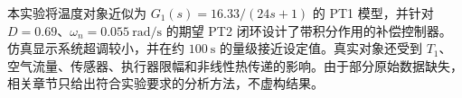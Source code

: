 本实验将温度对象近似为 $G_1(s) = 16.33/(24s + 1)$ 的 PT1 模型，并针对 $D = 0.69$、$\omega_n = \SI{0.055}{\radian\per\second}$ 的期望 PT2 闭环设计了带积分作用的补偿控制器。仿真显示系统超调较小，并在约 $\SI{100}{\second}$ 的量级接近设定值。真实对象还受到 $T_1$、空气流量、传感器、执行器限幅和非线性热传递的影响。由于部分原始数据缺失，相关章节只给出符合实验要求的分析方法，不虚构结果。
